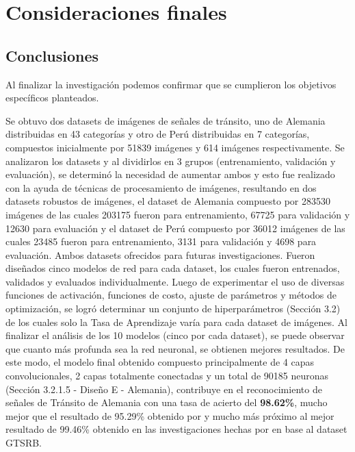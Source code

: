 \chapter{Consideraciones finales}
\setcounter{page}{128}
\renewcommand{\baselinestretch}{2} %
\textheight 21cm

\section{Conclusiones}

	Al finalizar la investigación podemos confirmar que se cumplieron los objetivos específicos planteados.

	Se obtuvo dos datasets de imágenes de señales de tránsito, uno de Alemania distribuidas en 43 categorías y otro de Perú distribuidas en 7 categorías, compuestos inicialmente por 51839 imágenes y 614 imágenes respectivamente.
\vskip 0.2cm
	Se analizaron los datasets y al dividirlos en 3 grupos (entrenamiento, validación y evaluación), se determinó la necesidad de aumentar ambos y esto fue realizado con la ayuda de técnicas de procesamiento de imágenes, resultando en dos datasets robustos de imágenes, el dataset de Alemania compuesto por 283530 imágenes de las cuales 203175 fueron para entrenamiento, 67725 para validación y 12630 para evaluación y el dataset de Perú compuesto por 36012 imágenes de las cuales 23485 fueron para entrenamiento, 3131 para validación y 4698 para evaluación. Ambos datasets ofrecidos para futuras investigaciones.
\vskip 0.2cm
	Fueron diseñados cinco modelos de red para cada dataset, los cuales fueron entrenados, validados y evaluados individualmente.
\vskip 0.2cm
	Luego de experimentar el uso de diversas funciones de activación, funciones de costo, ajuste de parámetros y métodos de optimización, se logró determinar un conjunto de hiperparámetros (Sección 3.2) de los cuales solo la Tasa de Aprendizaje varía para cada dataset de imágenes. 
	\vskip 0.2cm
	Al finalizar el análisis de los 10 modelos (cinco por cada dataset), se puede observar que cuanto más profunda sea la red neuronal, se obtienen mejores resultados. 
\vskip 0.2cm
	De este modo, el modelo final obtenido compuesto principalmente de 4 capas convolucionales, 2 capas totalmente conectadas y un total de 90185 neuronas (Sección 3.2.1.5 - Diseño E - Alemania), contribuye en el reconocimiento de señales de Tránsito de Alemania con una tasa de acierto del {\bf 98.62\%}, mucho mejor que el resultado de 95.29\% obtenido por \cite{Ayuque2016} y mucho más próximo al mejor resultado de 99.46\% obtenido en las investigaciones hechas por \cite{Ciresan} en base al dataset GTSRB.
	\vskip 0.2cm
	
